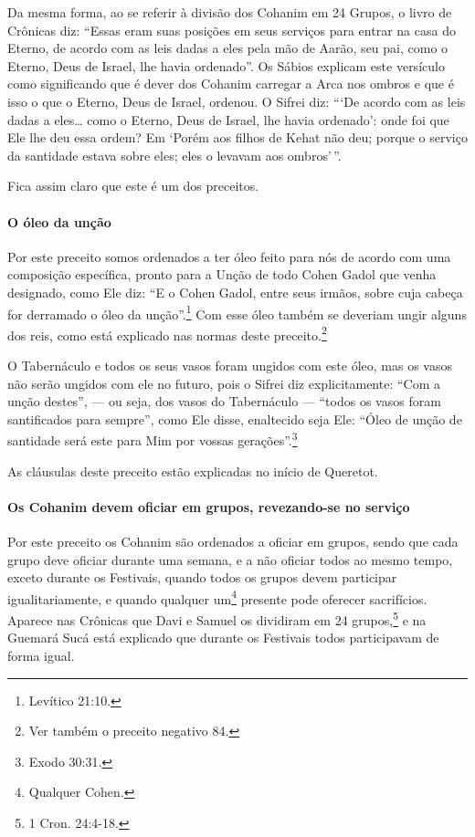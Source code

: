 Da mesma forma, ao se referir à divisão dos Cohanim em 24 Grupos, o
livro de Crônicas diz: ``Essas eram suas posições em seus serviços para
entrar na casa do Eterno, de acordo com as leis dadas a eles pela mão de
Aarão, seu pai, como o Eterno, Deus de Israel, lhe havia ordenado''. Os
Sábios explicam este versículo como significando que é dever dos
Cohanim carregar a Arca nos ombros e que é isso o que o Eterno, Deus
de Israel, ordenou. O Sifrei diz: ```De acordo com as leis dadas a eles\ldots{}
como o Eterno, Deus de Israel, lhe havia ordenado': onde foi que
Ele lhe deu essa ordem? Em `Porém aos filhos de Kehat não deu; porque o
serviço da santidade estava sobre eles; eles o levavam aos ombros'\,''.

Fica assim claro que este é um dos preceitos.

\paragraph{O óleo da unção}

Por este preceito somos ordenados a ter óleo feito para nós de acordo
com uma composição específica, pronto para a Unção de todo Cohen Gadol que venha designado, como Ele diz: ``E o Cohen Gadol, entre seus
irmãos, sobre cuja cabeça for derramado o óleo da unção''.\footnote{Levítico
21:10.} Com esse óleo também se deveriam ungir alguns dos reis, como
está explicado nas normas deste preceito.\footnote{Ver também o preceito negativo 84.}

O Tabernáculo e todos os seus vasos foram ungidos com este óleo,
mas os vasos não serão ungidos com ele no futuro, pois o Sifrei diz
explicitamente: ``Com a unção destes'', --- ou seja, dos vasos do
Tabernáculo --- ``todos os vasos foram santificados para sempre'', como
Ele disse, enaltecido seja Ele: ``Óleo de unção de santidade será este
para Mim por vossas gerações''.\footnote{Exodo 30:31.}

As cláusulas deste preceito estão explicadas no início de Queretot.

\paragraph{Os Cohanim devem oficiar em grupos, revezando-se no serviço}

Por este preceito os Cohanim são ordenados a oficiar em grupos,
sendo que cada grupo deve oficiar durante uma semana, e a não oficiar
todos ao mesmo tempo, exceto durante os Festivais, quando todos os grupos
devem participar igualitariamente, e quando qualquer
um\footnote{Qualquer Cohen.} presente pode oferecer sacrifícios. Aparece nas Crônicas que Davi e Samuel os dividiram em 24 grupos,\footnote{1 Cron. 24:4-18.}
e na Guemará Sucá está explicado que durante os Festivais todos
participavam de forma igual.

